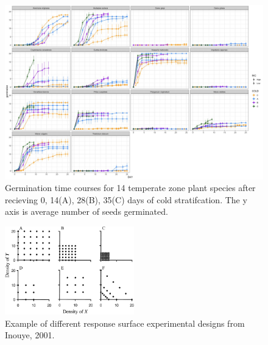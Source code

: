 \documentclass[12pt]{article}\usepackage[]{graphicx}\usepackage[]{color}
\begin{document}
\begin{figure}[here]
\begin{center}
\includegraphics[width=\textwidth,keepaspectratio]{..//figures/Time_course_output.jpeg}
\caption{Germination time courses for 14 temperate zone plant species after recieving 0, 14(A), 28(B), 35(C) days of cold stratifcation. The y axis is average number of seeds germinated.}
\label{fig:Figure 6}
\end{center}
\end{figure}


\begin{figure}[here]
\begin{center}
\includegraphics[width=0.5\textwidth]{..//figures/response_surface.jpg}
\caption{Example of different response surface experimental designs from Inouye, 2001.}
\label{fig:Figure 7}
\end{center}
\end{figure}

\end{document}
